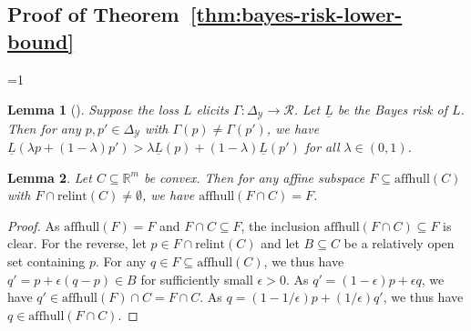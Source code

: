 \documentclass{article}
\newcommand{\Comments}{1}
\newcommand{\mynote}[2]{\ifnum\Comments=1\textcolor{#1}{#2}\fi}
\newcommand{\mytodo}[2]{\ifnum\Comments=1%
	\todo[linecolor=#1!80!black,backgroundcolor=#1,bordercolor=#1!80!black]{#2}\fi}
\newcommand{\raf}[1]{\mynote{green!80!blue}{[RF: #1]}}
\newcommand{\bo}[1]{\mynote{blue}{[Bo: #1]}}
\newcommand{\btw}[1]{\mytodo{gray!10!white}{\textcolor{gray}{BTW: #1}}}%
\newcommand{\reals}{\mathbb{R}}
\newcommand{\simplex}{\Delta_\Y}
\newcommand{\relint}[1]{\mathrm{relint}(#1)}
\newcommand{\affhull}{\mathrm{affhull}}
\newcommand{\R}{\mathcal{R}}
\newcommand{\Y}{\mathcal{Y}}
\newcommand{\lbar}{\underline{L}} %
\newtheorem{lemma}{Lemma}
\begin{document}
\subsection{Proof of Theorem~\ref{thm:bayes-risk-lower-bound}}

\btw{Bo: I assume this will go to the appendix}
\begin{lemma}[\citep{frongillo2018elicitation}]
	\label{lem:elic-complex-bayes-concave}
	Suppose the loss $L$ elicits $\Gamma:\simplex\to\R$.
	Let $\lbar$ be the Bayes risk of $L$.
	Then for any $p,p'\in\simplex$ with $\Gamma(p)\neq\Gamma(p')$, we have $\lbar(\lambda p + (1-\lambda) p') > \lambda \lbar(p) + (1-\lambda) \lbar(p')$ for all $\lambda\in(0,1)$.
\end{lemma}


\begin{lemma}\label{lem:affhull-relint}
	Let $C\subseteq\reals^m$ be convex.
	Then for any affine subspace $F\subseteq\affhull(C)$ with $F\cap\relint C \neq \emptyset$, we have $\affhull(F\cap C) = F$.
\end{lemma}
\begin{proof}
	As $\affhull(F) = F$ and $F\cap C\subseteq F$, the inclusion $\affhull(F\cap C) \subseteq F$ is clear.
	For the reverse, let $p\in F\cap\relint C$ and let $B\subseteq C$ be a relatively open set containing $p$.
	For any $q\in F \subseteq \affhull(C)$, we thus have $q' = p + \epsilon (q-p) \in B$ for sufficiently small $\epsilon > 0$.
	As $q' = (1-\epsilon) p + \epsilon q$, we have $q' \in \affhull(F)\cap C = F\cap C$.
	As $q = (1-1/\epsilon) p + (1/\epsilon) q'$, we thus have $q\in\affhull(F\cap C)$.
\end{proof}
\end{document}
